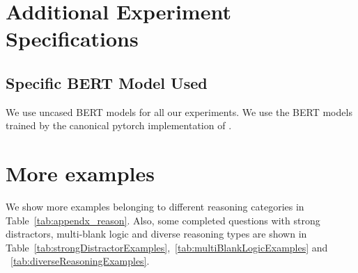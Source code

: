 \documentclass[11pt,a4paper]{article}
\begin{document}

\section{Additional Experiment Specifications}
\subsection{Specific BERT Model Used}
We use uncased BERT models for all our experiments. We use the BERT models trained by the canonical pytorch implementation of .

\section{More examples}
We show more examples belonging to different reasoning categories in Table~\ref{tab:appendx_reason}. Also, some completed questions with strong distractors, multi-blank logic and diverse reasoning types are shown in Table~\ref{tab:strongDistractorExamples},~\ref{tab:multiBlankLogicExamples} and ~\ref{tab:diverseReasoningExamples}.
\end{document}
